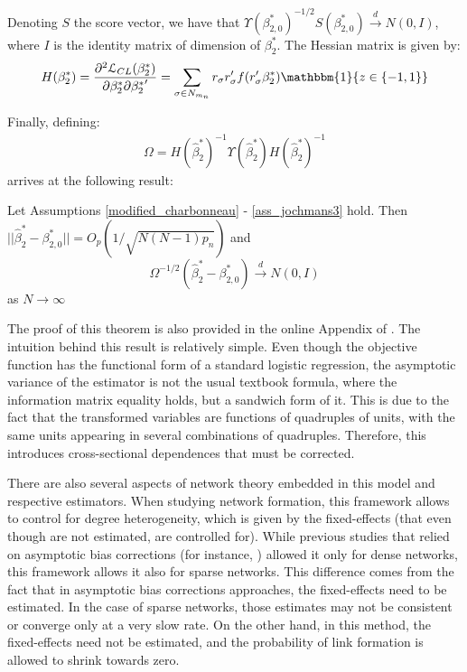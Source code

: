 Denoting $S$ the score vector, we have that $\Upsilon (\beta_{2,0}^*)^{-1/2} S(\beta_{2,0}^*) \xrightarrow{d} N(0,I)$, where $I$ is the identity matrix of dimension of $\beta_2^*$.
The Hessian matrix is given by:
\begin{align*}
    H (\beta_2^*) = \frac{\partial^2 \mathcal{L}_{CL}(\beta_2^*)}{\partial \beta_2^* \partial {\beta_2^*}'} = \sum_{\sigma \in N_{m_n}} r_\sigma r_\sigma' f(r_\sigma' \beta_2^*) \mathbbm{1}\{ z \in \{-1,1\}\}
\end{align*}

Finally, defining:
\begin{align*}
    \Omega = H {(\hat{\beta}_2^*)}^{-1} \Upsilon (\hat{\beta}_2^*) H {(\hat{\beta}_2^*)}^{-1}
\end{align*}
\cite{jochmans2018semiparametric} arrives at the following result:
\begin{theorem}
    Let Assumptions \ref{modified_charbonneau} - \ref{ass_jochmans3} hold. Then $\rvert \rvert \hat{\beta}_2^* - \beta_{2,0}^* \rvert \rvert = O_p (1/ \sqrt{N(N-1)p_n})$ and
    $$\Omega^{-1/2} (\hat{\beta}_2^* - \beta_{2,0}^*) \xrightarrow[]{d} N(0,I)$$
    as $N \xrightarrow{} \infty$
\end{theorem}

The proof of this theorem is also provided in the online Appendix of \cite{jochmans2018semiparametric}.
The intuition behind this result is relatively simple. Even though the objective function has the functional form of a standard logistic regression, the asymptotic variance of the estimator is not the usual textbook formula, where the information matrix equality holds, but a sandwich form of it. This is due to the fact that the transformed variables are functions of quadruples of units, with the same units appearing in several combinations of quadruples. Therefore, this introduces cross-sectional dependences that must be corrected.

There are also several aspects of network theory embedded in this model and respective estimators. When studying network formation, this framework allows to control for degree heterogeneity, which is given by the fixed-effects (that even though are not estimated, are controlled for). While previous studies that relied on asymptotic bias corrections (for instance, \cite{dzemski2019empirical}) allowed it only for dense networks, this framework allows it also for sparse networks. This difference comes from the fact that in asymptotic bias corrections approaches, the fixed-effects need to be estimated. In the case of sparse networks, those estimates may not be consistent or converge only at a very slow rate. On the other hand, in this method, the fixed-effects need not be estimated, and the probability of link formation is allowed to shrink towards zero. 


